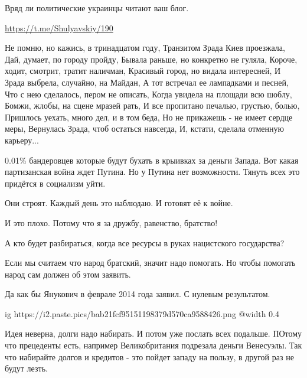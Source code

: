 \begin{itemize}

Вряд ли политические украинцы читают ваш блог.


\url{https://t.me/Shulyavskiy/190}

\obeycr
Не помню, но кажись, в тринадцатом году,
Транзитом Зрада Киев проезжала,
Дай, думает, по городу пройду,
Бывала раньше, но конкретно не гуляла,
Короче, ходит, смотрит, тратит наличман,
Красивый город, но видала интересней,
И Зрада выбрела, случайно, на Майдан,
А тот встречал ее лампадками и песней,
Что с нею сделалось, пером не описать,
Когда увидела на площади всю шоблу,
Бомжи, жлобы, на сцене мразей рать,
И все пропитано печалью, грустью, болью,
Пришлось уехать, много дел, и в том беда,
Но не прикажешь - не имеет сердце меры,
Вернулась Зрада, чтоб остаться навсегда,
И, кстати, сделала отменную карьеру...
\restorecr


0.01\% бандеровцев которые будут бухать в крыивках за деньги Запада. Вот какая
партизанская война ждет Путина. Но у Путина нет возможности. Тянуть всех это
придётся в социализм уйти.


Они строят. Каждый день это наблюдаю. И готовят её к войне.

И это плохо. Потому что я за дружбу, равенство, братство!

А кто будет разбираться, когда все ресурсы в руках нацистского государства?


Если мы считаем что народ братский, значит надо помогать. Но чтобы помогать
народ сам должен об этом заявить.


Да как бы Янукович в феврале 2014 года заявил. С нулевым результатом.


\ifcmt
  ig https://i2.paste.pics/bab21fcf95151198379d570ca9588426.png
  @width 0.4
\fi


Идея неверна, долги надо набирать. И потом уже послать всех подальше. ПОтому
что прецеденты есть, например Великобритания подрезала деньги Венесуэлы. Так
что набирайте долгов и кредитов  - это пойдет западу на пользу, в другой раз не
будут лезть.



\end{itemize}
